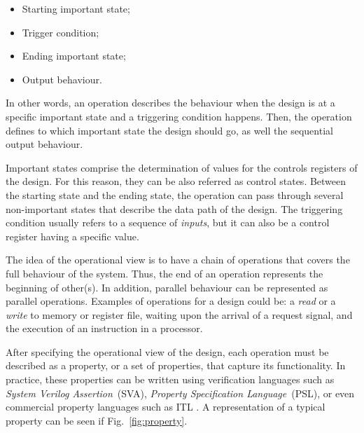 \begin{itemize}
    \item Starting important state;
    \item Trigger condition;
    \item Ending important state;
    \item Output behaviour.
\end{itemize}


In other words, an operation describes the behaviour when the design is at a specific important state and a triggering condition happens. Then, the operation defines to which important state the design should go, as well the sequential output behaviour. 

Important states comprise the determination of values for the controls registers of the design. For this reason, they can be also referred as control states. Between the starting state and the ending state, the operation can pass through several non-important states that describe the data path of the design. The triggering condition usually refers to a sequence of \textit{inputs}, but it can also be a control register having a specific value.

The idea of the operational view is to have a chain of operations that covers the full behaviour of the system.  Thus, the end of an operation represents the beginning of other(s). In addition, parallel behaviour can be represented as parallel operations. Examples of operations for a design could be: a \textit{read} or a \textit{write} to memory or register file, waiting upon the arrival of a request signal, and the execution of an instruction in a processor.

After specifying the operational view of the design, each operation must be described as a property, or a set of properties, that capture its functionality. In practice, these properties can be written using verification languages such as \textit{System Verilog Assertion}~(SVA), \textit{Property Specification Language}~(PSL), or even commercial property languages such as ITL \cite{onespin}. A representation of a typical property can be seen if Fig.~\ref{fig:property}.

